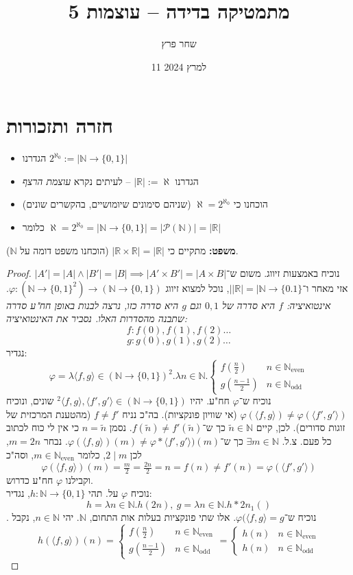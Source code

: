 \documentclass[]{article}
\title{מתמטיקה בדידה – עוצמות 5}
\author{שחר פרץ}
\date{11 למרץ 2024}
\newcommand\N     {\mathbb{N}}
\newcommand\R     {\mathbb{R}}
\newcommand\ps    {\mathcal{P}}
\newcommand\vphi  {\varphi}
\newcommand\Neven {\N_{\mathrm{even}}}
\newcommand\Nodd  {\N_{\mathrm{odd }}}
\newcommand\ra    {\rangle}
\newcommand\la    {\langle}
\newcommand\taz   {2^{\aleph_0}}
\newcommand\al    {\aleph}
\begin{document}
	\maketitle
	\section*{חזרה ותזכורות}
	\begin{itemize}
		\item הגדרנו $ \taz := |\N \to \{0, 1\}| $
		\item הגדרנו $ |\R| := \al $ – לעיתים נקרא \textit{עוצמת הרצף}
		\item הוכחנו כי $ \al = \taz $ (שניהם סימונים שיומושיים, בהקשרים שונים)
		\item כלומר $ \al = \taz = |\N\to \{0, 1\}| = |\ps(\N)| = |\R| $
	\end{itemize}
	\textbf{משפט: }מתקיים כי $ |\R \times \R| = |\R| $ (הוכחנו משפט דומה על $ \N $). 
	\begin{proof}
		נוכיח באמצעות זיווג. משום ש־$ |A'| = |A| \land |B'| = |B| \implies |A' \times B'| = |A \times B| $ אזי מאחר ו־$ ||\R| = |\N\to \{0. 1\} $, נוכל למצוא זיווג $ \vphi \colon (\N \to \{0, 1\}^2) \to (\N\to \{0, 1\}) $. \textit{אינטואיציה: $ f $ היא סדרה של $ 0, 1 $ וגם $ g $ היא סדרה כזו, נרצה לבנות באופן חח"ע סדרה שתבנה מהסדרות האלו. נסביר את האינטואיציה: }
			\[ f \colon f(0), f(1), f(2) \dots \]
			\[ g \colon g(0), g(1), g(2) \dots \]
			נגדיר: 
			\[ \vphi = \lambda \la f, g \ra \in (\N\to \{0, 1\})^2. \lambda n \in \N. \begin{cases}
				f(\tfrac{n}{2}) &n \in \Neven \\
				g(\tfrac{n - 1}{2}) &n \in \Nodd
			\end{cases} \]
		נוכיח ש‏־$ \vphi $ חח"ע. יהיו $ ^2\la f, g \ra, \la f', g' \ra \in (\N\to \{0, 1\}) $ שונים, ונוכיח $ \vphi(\la f, g \ra) \neq \vphi(\la f', g' \ra) $ (אי שוויון פונקציות). בה"כ נניח $ f \neq f' $ (מהטענת המרכזית של זוגות סדורים). לכן, קיים $ \tilde{n} \in \N $ כך ש־$ f(\tilde{n}) \neq f'(\tilde{n}) $. נסמן $ n = \tilde{n} $ כי אין לי כוח לכתוב ~ כל פעם. צ.ל. $ \exists m \in \N $ כך ש־$ \vphi(\la f, g\ra)(m) \neq \vphi*\la f', g'\ra)(m) $. נבחר $ m = 2n $, לכן $ 2 \mid m $, כלומר $ m \in \Neven $, וסה"כ 
		\[ \vphi(\la f, g \ra)(m) = \tfrac{m}{2} = \tfrac{2n}{2} = n = f(n) \neq f'(n) = \vphi(\la f', g' \ra)\]
		וקבילנו $ \vphi  $ חח"ע כדרוש. \\
		נוכיח $ \vphi $ על. תהי $ h \colon \N \to \{0, 1\} $, נגדיר: 
		\[ h = \lambda n \in \N. h(2n), \ g = \lambda n \in \N. h*2n _ 1() \]. 
		נוכיח ש־$ \vphi(\la f, g \ra = g $. אלו שתי פונקציות בעלות אות התחום, $ \N $. יהי $ n \in \N $, נקבל 
		\[ h(\la f, g \ra)(n) = \begin{cases} f(\tfrac{n}{2}) & n \in \Neven \\
			{g(\tfrac{n - 1}{2})} & n \in \Nodd
		\end{cases} =\begin{cases}
		h(n) & n \in \Neven \\
		h(n) &n \in \Nodd
	\end{cases} \]

	\end{proof}
\end{document}
